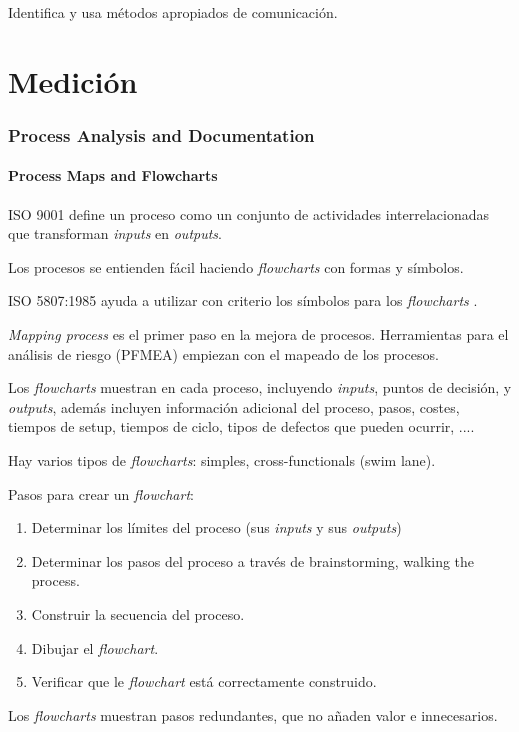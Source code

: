 \documentclass[]{article}
\begin{document}
Identifica y usa métodos apropiados de comunicación.
\pagebreak[4]
\part{Medición}
 
\section{Process Analysis and Documentation}

\subsection{Process Maps and Flowcharts}

ISO 9001 define un proceso como un conjunto de actividades interrelacionadas que transforman \textit{inputs} en \textit{outputs}.

Los procesos se entienden fácil haciendo \textit{flowcharts} con formas y símbolos.

ISO 5807:1985 ayuda a utilizar con criterio los símbolos para los \textit{flowcharts} .

\textit{Mapping process} es el primer paso en la mejora de procesos. Herramientas para el análisis de riesgo (PFMEA) empiezan con el mapeado de los procesos.

Los \textit{flowcharts} muestran en cada proceso, incluyendo \textit{inputs}, puntos de decisión, y \textit{outputs}, además incluyen información adicional del proceso, pasos, costes, tiempos de setup, tiempos de ciclo, tipos de defectos que pueden ocurrir, ....

Hay varios tipos de \textit{flowcharts}: simples, cross-functionals (swim lane).

Pasos para crear un \textit{flowchart}:

\begin{enumerate}
	\item Determinar los límites del proceso (sus \textit{inputs} y sus \textit{outputs})
	\item Determinar los pasos del proceso a través de brainstorming, walking the process.
	\item Construir la secuencia del proceso.
	\item Dibujar el \textit{flowchart}.
	\item Verificar que le \textit{flowchart} está correctamente construido.
\end{enumerate}

Los \textit{flowcharts} muestran pasos redundantes, que no añaden valor e innecesarios. 
\end{document}
